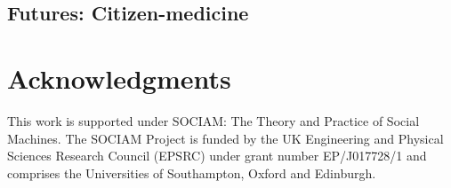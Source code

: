\documentclass{sig-alternate}
\begin{document}
\subsection{Futures: Citizen-medicine}

\section{Acknowledgments}

This work is supported under SOCIAM: The Theory and Practice of Social
Machines.  The SOCIAM Project is funded by the UK Engineering and
Physical Sciences Research Council (EPSRC) under grant number
EP/J017728/1 and comprises the Universities of Southampton, Oxford and
Edinburgh.

%

%
%


\balancecolumns %
\end{document}
